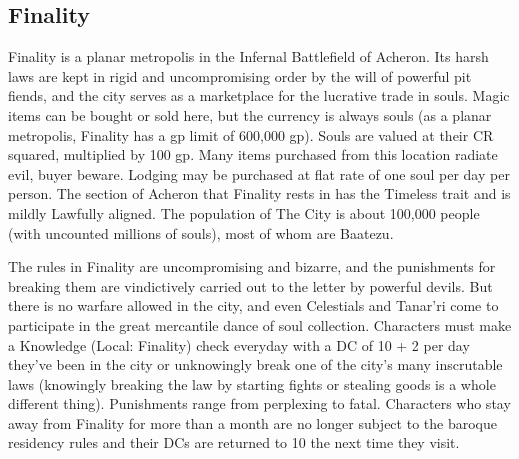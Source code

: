 \subsection{Finality}

Finality is a planar metropolis in the Infernal Battlefield of Acheron. Its harsh laws are kept in rigid and uncompromising order by the will of powerful pit fiends, and the city serves as a marketplace for the lucrative trade in souls. Magic items can be bought or sold here, but the currency is always souls (as a planar metropolis, Finality has a gp limit of 600,000 gp). Souls are valued at their CR squared, multiplied by 100 gp. Many items purchased from this location radiate evil, buyer beware. Lodging may be purchased at flat rate of one soul per day per person. The section of Acheron that Finality rests in has the Timeless trait and is mildly Lawfully aligned. The population of The City is about 100,000 people (with uncounted millions of souls), most of whom are Baatezu.

The rules in Finality are uncompromising and bizarre, and the punishments for breaking them are vindictively carried out to the letter by powerful devils. But there is no warfare allowed in the city, and even Celestials and Tanar'ri come to participate in the great mercantile dance of soul collection. Characters must make a Knowledge (Local: Finality) check everyday with a DC of 10 + 2 per day they've been in the city or unknowingly break one of the city's many inscrutable laws (knowingly breaking the law by starting fights or stealing goods is a whole different thing). Punishments range from perplexing to fatal. Characters who stay away from Finality for more than a month are no longer subject to the baroque residency rules and their DCs are returned to 10 the next time they visit.
